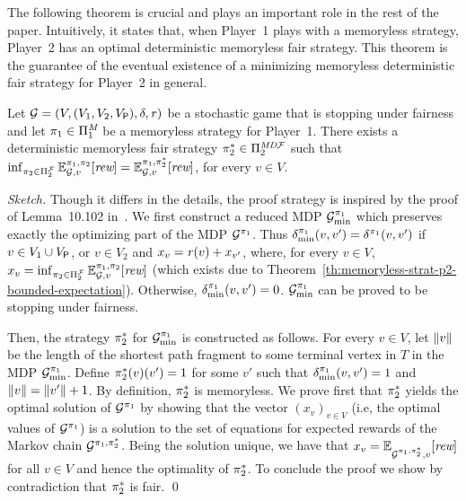 The following theorem is crucial and plays an important role in the rest of the
paper.  Intuitively, it states that, when Player~1 plays with a
memoryless strategy, Player~2 has an optimal deterministic
memoryless fair strategy.
%
This theorem is the guarantee of the eventual existence of a
minimizing memoryless deterministic fair strategy for Player~2 in general.
%
\begin{theorem}\label{th:infima-in-dmf}%
  Let $\mathcal{G}= (V, (V_1, V_2, V_{\mathsf{P}}), \delta, \mathit{r})$ be a
  stochastic game  that is stopping under fairness and let
  $\pi_{1} \in \Pi^{\textit{M}}_{1}$ be a memoryless strategy for
  Player~1.  There exists a deterministic memoryless fair strategy
  $\pi^*_{2}\in\Pi^{\textit{MD}\mathcal{F}}_{2}$ such that
  $\inf_{\pi_{2} \in \Pi^{\mathcal{F}}_{2}} \mathbb{E}^{\pi_{1}, \pi_{2}}_{\mathcal{G},v}[\textit{rew}]
   =
   \mathbb{E}^{\pi_{1}, \pi^*_{2}}_{\mathcal{G},v}[\textit{rew}]$, for every $v \in V$.
\end{theorem}
%
\begin{proof}[Sketch]
  Though it differs in the details, the proof strategy is inspired by
  the proof of Lemma~10.102 in~\cite{BaierK08}.
  We first construct a reduced MDP $\mathcal{G}^{\pi_{1}}_{\min}$ which
  preserves exactly the optimizing part of the MDP
  $\mathcal{G}^{\pi_{1}}$.
  Thus $\delta^{\pi_{1}}_{\min}(v,v')=\delta^{\pi_{1}}(v,v')$ if
  $v\in V_1\cup V_{\mathsf{P}}$, or $v\in V_2$ and
  $x_v=\mathit{r}(v)+x_{v'}$, where, for every $v\in V$,
  $x_v = \inf_{\pi_{2} \in \Pi^{\mathcal{F}}_{2}} \mathbb{E}^{\pi_{1}, \pi_{2}}_{\mathcal{G},v}[\textit{rew}]$
  (which exists due to Theorem~\ref{th:memoryless-strat-p2-bounded-expectation}).
  Otherwise, $\delta^{\pi_{1}}_{\min}(v,v')=0$.
  $\mathcal{G}^{\pi_{1}}_{\min}$ can be proved to be stopping under fairness.

  Then, the strategy $\pi^*_{2}$ for
  $\mathcal{G}^{\pi_{1}}_{\min}$ is constructed as follows.  For every
  $v\in V$, let ${\lVert{v}\rVert}$ be the length of the shortest path
  fragment to some terminal vertex in $T$ in the MDP
  $\mathcal{G}^{\pi_{1}}_{\min}$.  Define $\pi^*_{2}(v)(v')=1$
  for some $v'$ such that $\delta^{\pi_{1}}_{\min}(v,v')=1$ and
  ${\lVert{v}\rVert}={\lVert{v'}\rVert}+1$.
  By definition, $\pi^*_{2}$ is  memoryless.  We prove first that
  $\pi^*_{2}$ yields the optimal solution of
  $\mathcal{G}^{\pi_{1}}$ by showing that the vector $(x_v)_{v\in V}$
  (i.e, the optimal values of $\mathcal{G}^{\pi_{1}}$) is a solution to
  the set of equations for expected rewards of the Markov chain
  $\mathcal{G}^{\pi_{1},\pi^*_{2}}$.  Being the solution unique,
  we have that
  $x_v=\mathbb{E}^{}_{\mathcal{G}^{\pi_{1},\pi^*_{2}},v}[\textit{rew}]$
  for all $v\in V$ and hence the optimality of $\pi^*_{2}$.
  To conclude the proof we show by contradiction that
  $\pi^*_{2}$ is fair.
\qed
\end{proof}

